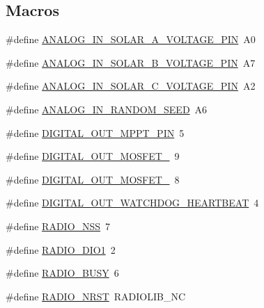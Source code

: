 \subsection*{Macros}
\begin{DoxyCompactItemize}
\item 
\#define \hyperlink{group__defines__pin__map_gaab66db65014df66541ac9eaa673ca3a2}{A\+N\+A\+L\+O\+G\+\_\+\+I\+N\+\_\+\+S\+O\+L\+A\+R\+\_\+\+A\+\_\+\+V\+O\+L\+T\+A\+G\+E\+\_\+\+P\+IN}~A0
\item 
\#define \hyperlink{group__defines__pin__map_ga8c7edf17cc2aeb690516a5a191a4f3fc}{A\+N\+A\+L\+O\+G\+\_\+\+I\+N\+\_\+\+S\+O\+L\+A\+R\+\_\+\+B\+\_\+\+V\+O\+L\+T\+A\+G\+E\+\_\+\+P\+IN}~A7
\item 
\#define \hyperlink{group__defines__pin__map_ga0810e1baf8fee374bd20c12df8035bb3}{A\+N\+A\+L\+O\+G\+\_\+\+I\+N\+\_\+\+S\+O\+L\+A\+R\+\_\+\+C\+\_\+\+V\+O\+L\+T\+A\+G\+E\+\_\+\+P\+IN}~A2
\item 
\#define \hyperlink{group__defines__pin__map_ga2c37472ba18c707ade2c29026d3ae381}{A\+N\+A\+L\+O\+G\+\_\+\+I\+N\+\_\+\+R\+A\+N\+D\+O\+M\+\_\+\+S\+E\+ED}~A6
\item 
\#define \hyperlink{group__defines__pin__map_ga86d0364d62209e854ee7dc783255e2fe}{D\+I\+G\+I\+T\+A\+L\+\_\+\+O\+U\+T\+\_\+\+M\+P\+P\+T\+\_\+\+P\+IN}~5
\item 
\#define \hyperlink{group__defines__pin__map_gaf1e5e3b5dc8bce89eaae616ec0549f57}{D\+I\+G\+I\+T\+A\+L\+\_\+\+O\+U\+T\+\_\+\+M\+O\+S\+F\+E\+T\+\_}~9
\item 
\#define \hyperlink{group__defines__pin__map_ga8ca8e1d48d4ef0197942b0595a418691}{D\+I\+G\+I\+T\+A\+L\+\_\+\+O\+U\+T\+\_\+\+M\+O\+S\+F\+E\+T\+\_}~8
\item 
\#define \hyperlink{group__defines__pin__map_ga69f1b8867057ee6b56bdcb0263a0d862}{D\+I\+G\+I\+T\+A\+L\+\_\+\+O\+U\+T\+\_\+\+W\+A\+T\+C\+H\+D\+O\+G\+\_\+\+H\+E\+A\+R\+T\+B\+E\+AT}~4
\item 
\#define \hyperlink{group__defines__pin__map_gaecada0a0e3aa3c8f32ce02c1c55e2479}{R\+A\+D\+I\+O\+\_\+\+N\+SS}~7
\item 
\#define \hyperlink{group__defines__pin__map_gac9a997955646825175329d152f768687}{R\+A\+D\+I\+O\+\_\+\+D\+I\+O1}~2
\item 
\#define \hyperlink{group__defines__pin__map_gaffafa27b50d931e6ffbe8e0622ac9658}{R\+A\+D\+I\+O\+\_\+\+B\+U\+SY}~6
\item 
\#define \hyperlink{group__defines__pin__map_ga3cc20f8473f1a75e9957b05d5e220e36}{R\+A\+D\+I\+O\+\_\+\+N\+R\+ST}~R\+A\+D\+I\+O\+L\+I\+B\+\_\+\+NC
\end{DoxyCompactItemize}


